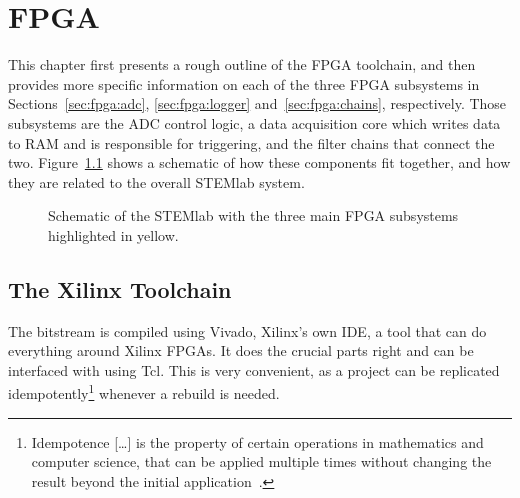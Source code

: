 %
%
\chapter{FPGA} %
\label{ch:fpga}
%
%

This chapter  first presents a rough  outline of the FPGA  toolchain, and then
provides more  specific information on  each of  the three FPGA  subsystems in
Sections~\ref{sec:fpga:adc},  \ref{sec:fpga:logger} and~\ref{sec:fpga:chains},
respectively. Those subsystems are  the ADC control logic,  a data acquisition
core  which writes  data to  RAM and  is responsible  for triggering,  and the
filter chains  that connect the two.   Figure~\ref{fig:fpga:structure} shows a
schematic of  how these components fit  together, and how they  are related to
the overall STEMlab system.

\begin{figure}
    \centering
    
    \caption[System Schematic]{%
        Schematic  of  the  STEMlab  with   the  three  main  FPGA  subsystems
        highlighted in yellow.%
    }
    \label{fig:fpga:structure}
\end{figure}
%
%
\section{The Xilinx Toolchain} %
\label{sec:fpga:toolchain}

The bitstream is compiled  using Vivado, Xilinx's own IDE, a  tool that can do
everything around  Xilinx FPGAs. It does  the crucial  parts right and  can be
interfaced  with using  Tcl. This  is very  convenient, as  a  project can  be
replicated idempotently\footnote{%
    Idempotence [\ldots] is the property  of certain operations in mathematics
    and computer science, that can  be applied multiple times without changing
    the result beyond the initial application~\cite{wiki:idempotence}.%
}%
whenever a rebuild is needed.

